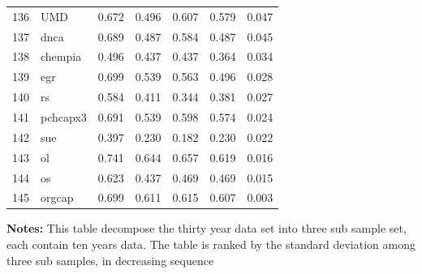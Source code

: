 \documentclass[12pt]{article}
\begin{document}
\begin{footnotesize}
\begin{longtable}{rl|c|c|c|c|c}
		136 & UMD & 0.672 & 0.496 & 0.607 & 0.579 & 0.047 \\ 
		137 & dnca & 0.689 & 0.487 & 0.584 & 0.487 & 0.045 \\ 
		138 & chempia & 0.496 & 0.437 & 0.437 & 0.364 & 0.034 \\ 
		139 & egr & 0.699 & 0.539 & 0.563 & 0.496 & 0.028 \\ 
		140 & rs & 0.584 & 0.411 & 0.344 & 0.381 & 0.027 \\ 
		141 & pchcapx3 & 0.691 & 0.539 & 0.598 & 0.574 & 0.024 \\ 
		142 & sue & 0.397 & 0.230 & 0.182 & 0.230 & 0.022 \\ 
		143 & ol & 0.741 & 0.644 & 0.657 & 0.619 & 0.016 \\ 
		144 & os & 0.623 & 0.437 & 0.469 & 0.469 & 0.015 \\ 
		145 & orgcap & 0.699 & 0.611 & 0.615 & 0.607 & 0.003 \\ 
		\hline
	\end{longtable}
			\begin{minipage}{\textwidth}
	{\footnotesize {\bf Notes:}	This table decompose the thirty year data set into three sub sample set, each contain ten years data. The table is ranked by the standard deviation among three sub samples, in decreasing sequence}
\end{minipage}

\end{footnotesize}


\newpage
\end{document}
